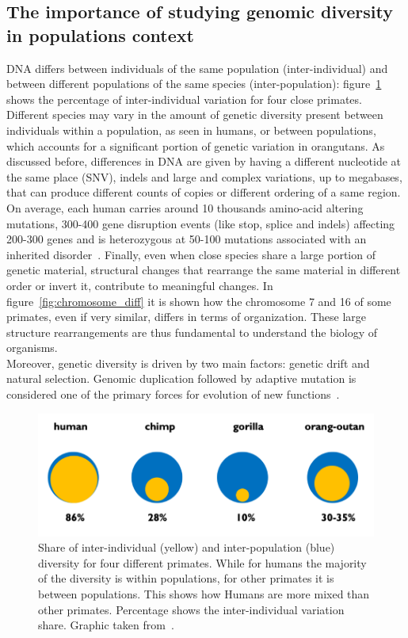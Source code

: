 \subsection{The importance of studying genomic diversity in populations context}
DNA differs between individuals of the same population (inter-individual) and between different populations of the same species (inter-population): figure~\ref{fig:pop_diff} shows the percentage of inter-individual variation for four close primates. Different species may vary in the amount of genetic diversity present between individuals within a population, as seen in humans, or between populations, which accounts for a significant portion of genetic variation in orangutans. As discussed before, differences in DNA are given by having a different nucleotide at the same place (SNV), indels and large and complex variations, up to megabases, that can produce different counts of copies or different ordering of a same region.\\
On average, each human carries around 10 thousands amino-acid altering mutations, 300-400 gene disruption events (like stop, splice and indels) affecting 200-300 genes and is heterozygous at 50-100 mutations associated with an inherited disorder~\cite{genome_diversity_quintana}. 
Finally, even when close species share a large portion of genetic material, structural changes that rearrange the same material in different order or invert it, contribute to meaningful changes. In figure~\ref{fig:chromosome_diff} it is shown how the chromosome 7 and 16 of some primates, even if very similar, differs in terms of organization. These large structure rearrangements are thus fundamental to understand the biology of organisms.\\
Moreover, genetic diversity is driven by two main factors: genetic drift and natural selection. Genomic duplication followed by adaptive mutation is considered one of the primary forces for evolution of new functions~\cite{tbc1d3}.
\begin{figure}[H]
	\centering
	\includegraphics[width=.8\linewidth]{figures/background/pop_diff.png}
	\caption[Inter-individual and inter-population variation for 4 primate species.]{Share of inter-individual (yellow) and inter-population (blue) diversity for four different primates. While for humans the  majority of the diversity is within populations, for other primates it is between populations. This shows how Humans are more mixed than other primates. Percentage shows the inter-individual variation share. Graphic taken from~\cite{genome_diversity_quintana}.}
	\label{fig:pop_diff}
\end{figure}

